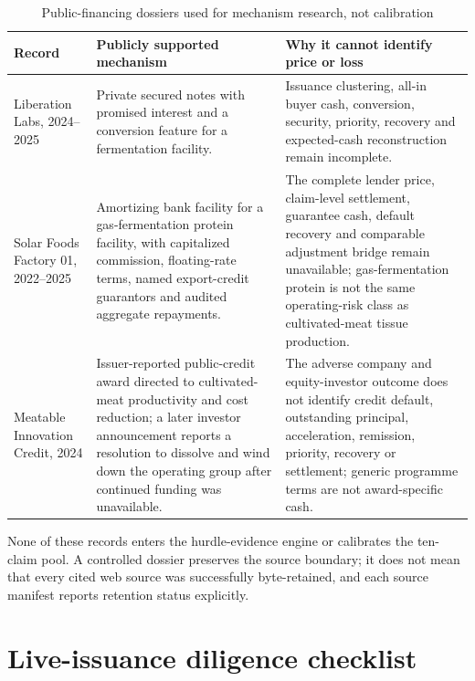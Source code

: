 \documentclass[11pt,a4paper]{article}
\begin{document}
\begin{table}[htbp]
\centering
\caption{Public-financing dossiers used for mechanism research, not calibration}
\label{tab:transaction-evidence}
\small
\begin{tabularx}{\textwidth}{@{}P{0.19\textwidth}P{0.31\textwidth}Y@{}}
\toprule
\textbf{Record} & \textbf{Publicly supported mechanism} & \textbf{Why it cannot identify price or loss} \\
\midrule
Liberation Labs, 2024--2025 \citep{fca2026liberationdossier} & Private secured notes with promised interest and a conversion feature for a fermentation facility. & Issuance clustering, all-in buyer cash, conversion, security, priority, recovery and expected-cash reconstruction remain incomplete. \\
Solar Foods Factory 01, 2022--2025 \citep{fca2026solarfoodsdossier} & Amortizing bank facility for a gas-fermentation protein facility, with capitalized commission, floating-rate terms, named export-credit guarantors and audited aggregate repayments. & The complete lender price, claim-level settlement, guarantee cash, default recovery and comparable adjustment bridge remain unavailable; gas-fermentation protein is not the same operating-risk class as cultivated-meat tissue production. \\
Meatable Innovation Credit, 2024 \citep{fca2026meatabledossier,agronomics2025meatabledissolution} & Issuer-reported public-credit award directed to cultivated-meat productivity and cost reduction; a later investor announcement reports a resolution to dissolve and wind down the operating group after continued funding was unavailable. & The adverse company and equity-investor outcome does not identify credit default, outstanding principal, acceleration, remission, priority, recovery or settlement; generic programme terms are not award-specific cash. \\
\bottomrule
\end{tabularx}
\end{table}
\FloatBarrier

None of these records enters the hurdle-evidence engine or calibrates the ten-claim pool. A controlled dossier preserves the source boundary; it does not mean that every cited web source was successfully byte-retained, and each source manifest reports retention status explicitly.

\section{Live-issuance diligence checklist}
\label{app:diligence}
\end{document}
